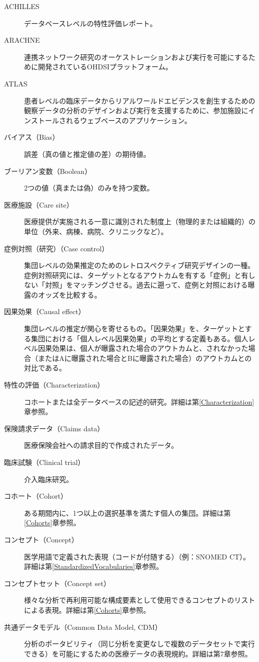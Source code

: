 \documentclass[
  11pt]{book}
\theoremstyle{definition}
\theoremstyle{definition}
\theoremstyle{definition}
\theoremstyle{definition}
\theoremstyle{remark}
\begin{document}
\begin{description}
\item[ACHILLES]
データベースレベルの特性評価レポート。
\item[ARACHNE]
連携ネットワーク研究のオーケストレーションおよび実行を可能にするために開発されているOHDSIプラットフォーム。
\item[ATLAS]
患者レベルの臨床データからリアルワールドエビデンスを創生するための観察データの分析のデザインおよび実行を支援するために、参加施設にインストールされるウェブベースのアプリケーション。
\item[バイアス（Bias）]
誤差（真の値と推定値の差）の期待値。
\item[ブーリアン変数（Boolean）]
2つの値（真または偽）のみを持つ変数。
\item[医療施設（Care site）]
医療提供が実施される一意に識別された制度上（物理的または組織的）の単位（外来、病棟、病院、クリニックなど）。
\item[症例対照（研究）（Case control）]
集団レベルの効果推定のためのレトロスペクティブ研究デザインの一種。症例対照研究には、ターゲットとなるアウトカムを有する「症例」と有しない「対照」をマッチングさせる。過去に遡って、症例と対照における曝露のオッズを比較する。
\item[因果効果（Causal effect）]
集団レベルの推定が関心を寄せるもの。「因果効果」を、ターゲットとする集団における「個人レベル因果効果」の平均とする定義もある。個人レベル因果効果は、個人が曝露された場合のアウトカムと、されなかった場合（またはAに曝露された場合とBに曝露された場合）のアウトカムとの対比である。
\item[特性の評価（Characterization）]
コホートまたは全データベースの記述的研究。詳細は第\ref{Characterization}章参照。
\item[保険請求データ（Claims data）]
医療保険会社への請求目的で作成されたデータ。
\item[臨床試験（Clinical trial）]
介入臨床研究。
\item[コホート（Cohort）]
ある期間内に、1つ以上の選択基準を満たす個人の集団。詳細は第\ref{Cohorts}章参照。
\item[コンセプト（Concept）]
医学用語で定義された表現（コードが付随する）（例：SNOMED CT）。詳細は第\ref{StandardizedVocabularies}章参照。
\item[コンセプトセット（Concept set）]
様々な分析で再利用可能な構成要素として使用できるコンセプトのリストによる表現。詳細は第\ref{Cohorts}章参照。
\item[共通データモデル（Common Data Model, CDM）]
分析のポータビリティ（同じ分析を変更なしで複数のデータセットで実行できる）を可能にするための医療データの表現規約。詳細は第7章参照。

\end{description}
\end{document}
